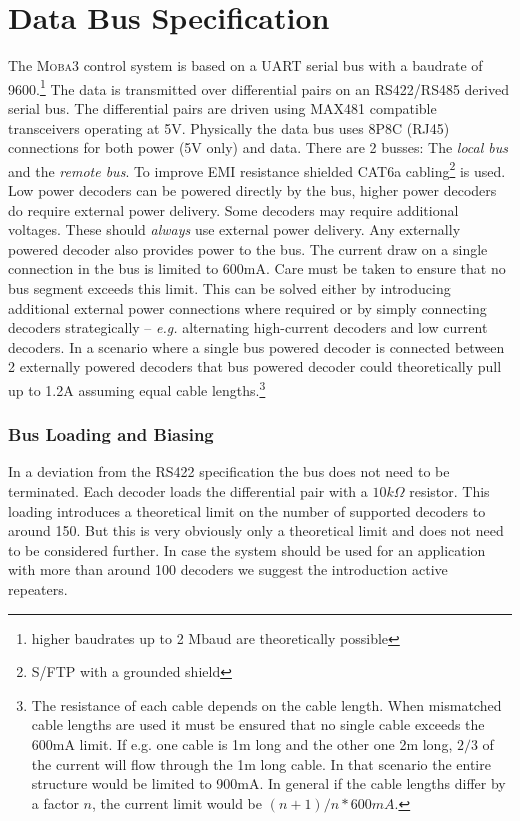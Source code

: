 \documentclass{scrreprt}
\begin{document}
\section{Data Bus Specification}
The \textsc{Moba3} control system is based on a UART serial bus with a baudrate of 9600.\footnote{higher baudrates up to 2 Mbaud are theoretically possible}
The data is transmitted over differential pairs on an RS422/RS485 derived serial bus.
The differential pairs are driven using MAX481 compatible transceivers operating at 5V.
Physically the data bus uses 8P8C (RJ45) connections for both power (5V only) and data.
There are 2 busses:
The \emph{local bus} and the \emph{remote bus}.
To improve EMI resistance shielded CAT6a cabling\footnote{S/FTP with a grounded shield} is used.
Low power decoders can be powered directly by the bus, higher power decoders do require external power delivery.
Some decoders may require additional voltages.
These should \emph{always} use external power delivery.
Any externally powered decoder also provides power to the bus.
The current draw on a single connection in the bus is limited to 600mA.
Care must be taken to ensure that no bus segment exceeds this limit.
This can be solved either by introducing additional external power connections where required or by simply connecting decoders strategically -- \emph{e.g.} alternating high-current decoders and low current decoders.
In a scenario where a single bus powered decoder is connected between 2 externally powered decoders that bus powered decoder could theoretically pull up to 1.2A assuming equal cable lengths.\footnote{The resistance of each cable depends on the cable length.
When mismatched cable lengths are used it must be ensured that no single cable exceeds the 600mA limit.
If e.g. one cable is 1m long and the other one 2m long, $2/3$ of the current will flow through the 1m long cable.
In that scenario the entire structure would be limited to 900mA.
In general if the cable lengths differ by a factor $n$, the current limit would be $(n+1)/n * 600mA$.}

\subsubsection {Bus Loading and Biasing}
In a deviation from the RS422 specification the bus does not need to be terminated. Each decoder loads the differential pair with a $10k\Omega$ resistor. This loading introduces a theoretical limit on the number of supported decoders to around 150. But this is very obviously only a theoretical limit and does not need to be considered further. In case the system should be used for an application with more than around 100 decoders we suggest the introduction active repeaters.
\end{document}
